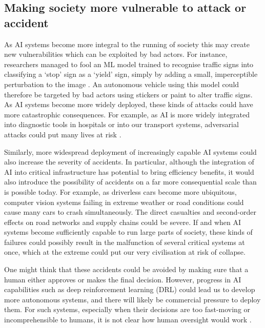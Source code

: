 \documentclass{article}
\begin{document}
\subsection{Making society more vulnerable to attack or accident}

As AI systems become more integral to the running of society this may create new vulnerabilities which can be exploited by bad actors. For instance, researchers managed to fool an ML model trained to recognise traffic signs into classifying a ‘stop’ sign as a ‘yield’ sign, simply by adding a small, imperceptible perturbation to the image \citep{papernot_practical_2017}. An autonomous vehicle using this model could therefore be targeted by bad actors using stickers or paint to alter traffic signs. As AI systems become more widely deployed, these kinds of attacks could have more catastrophic consequences. For example, as AI is more widely integrated into diagnostic tools in hospitals or into our transport systems, adversarial attacks could put many lives at risk \citep{finlayson_adversarial_2019,brundage_malicious_2018}.

Similarly, more widespread deployment of increasingly capable AI systems could also increase the severity of accidents. In particular, although the integration of AI into critical infrastructure has potential to bring efficiency benefits, it would also introduce the possibility of accidents on a far more consequential scale than is possible today. For example, as driverless cars become more ubiquitous, computer vision systems failing in extreme weather or road conditions could cause many cars to crash simultaneously. The direct casualties and second-order effects on road networks and supply chains could be severe. If and when AI systems become sufficiently capable to run large parts of society, these kinds of failures could possibly result in the malfunction of several critical systems at once, which at the extreme could put our very civilisation at risk of collapse.

One might think that these accidents could be avoided by making sure that a human either approves or makes the final decision. However, progress in AI capabilities such as deep reinforcement learning (DRL) could lead us to develop more autonomous systems, and there will likely be commercial pressure to deploy them. For such systems, especially when their decisions are too fast-moving or incomprehensible to humans, it is not clear how human oversight would work \citep{whittlestone_societal_2021}. 
\end{document}
